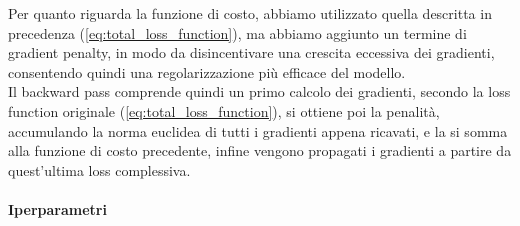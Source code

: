 \documentclass[a4paper,10pt,twocolumn]{article}
\begin{document}
Per quanto riguarda la funzione di costo, abbiamo utilizzato quella descritta in precedenza (\ref{eq:total_loss_function}),
ma abbiamo aggiunto un termine di gradient penalty, in modo da disincentivare una crescita eccessiva dei gradienti, consentendo quindi una regolarizzazione più efficace del modello. \\
Il backward pass comprende quindi un primo calcolo dei gradienti, secondo la loss function originale (\ref{eq:total_loss_function}), si ottiene poi la penalità,
accumulando la norma euclidea di tutti i gradienti appena ricavati, e la si somma alla funzione di costo precedente, infine vengono propagati i gradienti a partire da quest'ultima loss complessiva.

\paragraph{Iperparametri}
\end{document}
